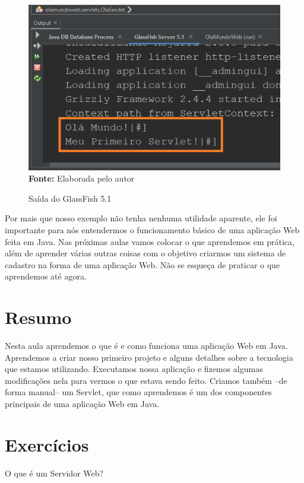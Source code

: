 \FloatBarrier
\begin{figure}[!htbp]
    \centering
    \caption{Saída do GlassFish 5.1}
    \includegraphics[scale=0.9]{imagens/cap01SaidaGlassFish}
    \\\textbf{Fonte:} Elaborada pelo autor
    \label{fig:cap01SaidaGlassFish}
\end{figure}
\FloatBarrier
    
Por mais que nosso exemplo não tenha nenhuma utilidade aparente, ele foi importante para nós entendermos o funcionamento básico de uma aplicação Web feita em Java. Nas próximas aulas vamos colocar o que aprendemos em prática, além de aprender várias outras coisas com o objetivo criarmos um sistema de cadastro na forma de uma aplicação Web. Não se esqueça de praticar o que aprendemos até agora. 


\section{Resumo}

Nesta aula aprendemos o que é e como funciona uma aplicação Web em Java. Aprendemos a criar nosso primeiro projeto e alguns detalhes sobre a tecnologia que estamos utilizando. Executamos nossa aplicação e fizemos algumas modificações nela para vermos o que estava sendo feito. Criamos também –de forma manual– um Servlet, que como aprendemos é um dos componentes principais de uma aplicação Web em Java.


\section{Exercícios}

\begin{exercicioSemArquivo}{}{}{}
    O que é um Servidor Web?
\end{exercicioSemArquivo}


